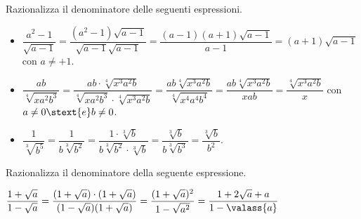\begin{esempi}{}{}
Razionalizza il denominatore delle seguenti espressioni.
\begin{itemize} [left=0mm]
\item 
\(\dfrac{a^2-1}{\sqrt{a-1}} =
  \dfrac{(a^2-1)\sqrt{a-1}}{\sqrt{a-1}\sqrt{a-1}} =
  \dfrac{(a-1)(a+1)\sqrt{a-1}}{a-1} = (a+1)\sqrt{a-1}\)
con \(a \neq +1\).
\item 
\(\dfrac{ab}{\sqrt[4]{xa^2b^3}}=
\dfrac{ab\cdot \sqrt[4]{x^3a^2b}}{\sqrt[4]{xa^2b^3}\cdot 
\sqrt[4]{x^3a^2b}}=
\dfrac{ab\sqrt[4]{x^3a^2b}}{\sqrt[4]{x^4a^4b^4}}=
\dfrac{ab\sqrt[4]{x^3a^2b}}{xab} = \dfrac{\sqrt[4]{x^3a^2b}} x\)
con \(a \neq 0 \stext{e} b \neq 0\).
\item \(\dfrac 1{\sqrt[3]{b^5}} = \dfrac 1{b\sqrt[3]{b^2}} =
      \dfrac{1\cdot \sqrt[3]b}{b\sqrt[3]{b^2}\cdot \sqrt[3]b} =
      \dfrac{\sqrt[3]b}{b\sqrt[3]{b^3}} =
      \dfrac{\sqrt[3]b}{b^2}\).
\end{itemize}
\end{esempi}

\begin{esempio}{}{}
Razionalizza il denominatore della seguente espressione.

\(\dfrac{1+\sqrt a}{1-\sqrt a}=
\dfrac{(1+\sqrt a)\cdot (1+\sqrt a)}{(1-\sqrt a)(1+\sqrt a)}=
\dfrac{(1+\sqrt a)^2}{1-\sqrt{a^2}}=\dfrac{1+2\sqrt a+a}{1-\valass{a}}\) 
\end{esempio}
% 
